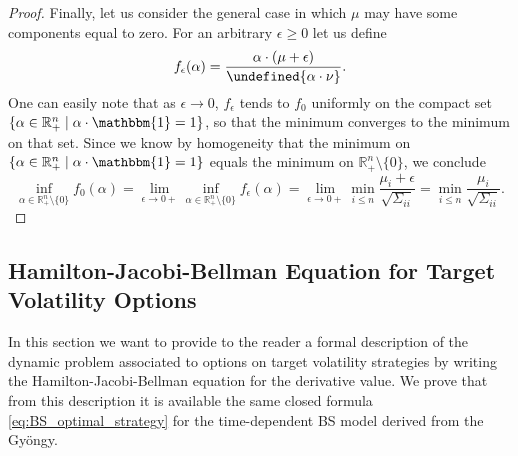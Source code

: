 \documentclass[11pt]{article}
\let\norm\undefined %
\DeclarePairedDelimiter\norm{\lVert}{\rVert}
\begin{document}
\begin{proof}
	Finally, let us consider the general case in which $\mu$ may have some components equal to zero. For an arbitrary $\epsilon \geq 0$ let us define
	\[
	f_{\epsilon}(\alpha) = \frac{\alpha \cdot (\mu+\epsilon)}{\norm{\alpha \cdot \nu}}.
	\]
	One can easily note that as $\epsilon \to 0$, $f_{\epsilon}$ tends to $f_{0}$ uniformly on the compact set $\{\alpha \in \mathbb{R}^n_+ \mid \alpha \cdot \mathbbm{1} = 1\}$, so that the minimum converges to the minimum on that set. Since we know by homogeneity that the minimum on $\{\alpha \in \mathbb{R}^n_+ \mid \alpha \cdot \mathbbm{1} = 1\}$ equals the minimum on $\mathbb{R}^n_+ \setminus \{0\}$, we conclude
	\[
	\inf_{\alpha \in \mathbb{R}_{+}^n \setminus \{0\}} f_0(\alpha) = 
	\lim_{\epsilon \to 0+} \inf_{\alpha \in \mathbb{R}_{+}^n \setminus \{0\}} f_{\epsilon}(\alpha) = 
	\lim_{\epsilon \to 0+} \min_{i\leq n} \frac{\mu_i+\epsilon}{\sqrt{\Sigma_{ii}}} =
	\min_{i\leq n} \frac{\mu_i}{\sqrt{\Sigma_{ii}}}.
	\]
\end{proof}

\subsection{Hamilton-Jacobi-Bellman Equation for Target Volatility Options} 
In this section we want to provide to the reader a formal description of the dynamic problem associated to options on target volatility strategies by writing the Hamilton-Jacobi-Bellman equation for the derivative value. We prove that from this description it is available the same closed formula \eqref{eq:BS_optimal_strategy} for the time-dependent BS model derived from the Gy\"ongy. 
\end{document}
